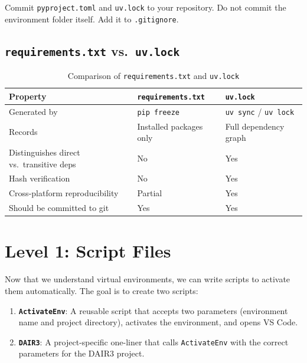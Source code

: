 \begin{infobox}
Commit \texttt{pyproject.toml} and \texttt{uv.lock} to your
repository. Do not commit the environment folder itself. Add it to
\texttt{.gitignore}.
\end{infobox}

\subsection{\texttt{requirements.txt} vs.\ \texttt{uv.lock}}

\begin{table}[h]
\centering
\caption{Comparison of \texttt{requirements.txt} and \texttt{uv.lock}}
\label{tab:req-vs-lock}
\begin{tabular}{@{}p{}p{}p{}@{}}
\toprule
\textbf{Property} & \textbf{\texttt{requirements.txt}} & \textbf{\texttt{uv.lock}} \\
\midrule
Generated by
  & \texttt{pip freeze}
  & \texttt{uv sync} / \texttt{uv lock} \\[4pt]
Records
  & Installed packages only
  & Full dependency graph \\[4pt]
Distinguishes direct vs.\ transitive deps
  & No
  & Yes \\[4pt]
Hash verification
  & No
  & Yes \\[4pt]
Cross-platform reproducibility
  & Partial
  & Yes \\[4pt]
Should be committed to git
  & Yes
  & Yes \\
\bottomrule
\end{tabular}
\end{table}

\section{Level 1: Script Files}
\label{sec:level1}

Now that we understand virtual environments, we can write scripts to
activate them automatically. The goal is to create two scripts:

\begin{enumerate}
  \item \textbf{\texttt{ActivateEnv}}: A reusable script that accepts
        two parameters (environment name and project directory), activates
        the environment, and opens VS Code.
  \item \textbf{\texttt{DAIR3}}: A project-specific one-liner that calls
        \texttt{ActivateEnv} with the correct parameters for the DAIR3
        project.
\end{enumerate}

